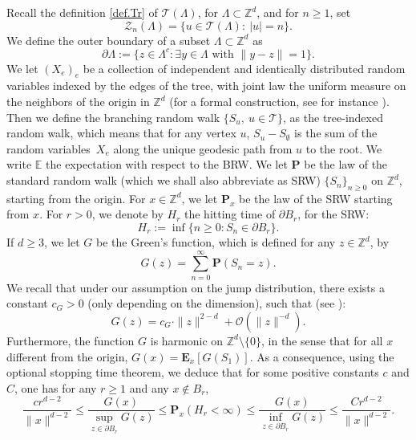 \documentclass[11pt]{article}
\numberwithin{equation}{section}
\theoremstyle{plain}
\theoremstyle{definition}
\newcommand\Z{\mathbb{Z}}
\newcommand\bE{\mathbb{E}}
\newcommand{\1}{{\text{\Large $\mathfrak 1$}}}
\begin{document}
Recall the definition \eqref{def.Tr} of $\mathcal T(\Lambda)$, for $\Lambda\subset
\Z^d$, and for $n\ge 1$, set
\begin{equation}\label{ZnLambda}
\mathcal Z_n(\Lambda)=\{u\in \mathcal T(\Lambda):\ |u|=n\}.
\end{equation}
We define the outer boundary of a subset $\Lambda\subset \mathbb Z^d$ as
\[
\partial \Lambda := \{ z \in \Lambda^c : \exists y\in \Lambda \text{ with }\|y-z\|= 1\}.
\]
We let $(X_e)_e$ be a collection of independent and identically distributed random variables indexed by the edges of the tree, with
joint law the uniform measure on the neighbors of the origin in $\mathbb Z^d$
(for a formal construction, see for instance \cite{Shi}). Then we define the branching random walk $\{S_u,\ u\in \mathbf {\mathcal T}\}$, as the tree-indexed random walk, which means that for
any vertex $u$, $S_u-S_\emptyset$ is the sum of the
random variables~$X_e$ along the unique geodesic path from $u$ to the root.
We write $\bE$ the expectation with respect to the BRW. We let
$\mathbf P$ be the law of the standard random walk (which we shall also abbreviate as SRW) $\{S_n\}_{n\ge 0}$ on $\Z^d$, starting from the origin.
For $x\in \mathbb Z^d$, we let $\mathbf P_x$ be the law of the SRW starting from $x$. For $r > 0$,
we denote by $H_r$ the hitting time
of $\partial B_r$, for the SRW:
\begin{equation}\label{Hr}
H_r:= \inf\{n \ge 0 : S_n \in \partial B_r\}.
\end{equation}
If $d\ge 3$, we let
$G$ be the Green's function, which is defined for any $z\in \mathbb Z^d$, by
\[
G(z) = \sum_{n=0}^\infty \mathbf P(S_n= z).
\]
We recall that under our assumption on the jump distribution, there exists a constant $c_G>0$ (only depending on the dimension), such that (see \cite[Th.\,4.3.1]{LL10}):
\begin{equation}\label{Green}
G(z) = c_G\cdot \|z\|^{2-d} + \mathcal O(\|z\|^{-d}).
\end{equation}
Furthermore, the function $G$ is harmonic on $\mathbb Z^d\setminus \{0\}$, in the sense that for all $x$ different from the origin,
$G(x) = \mathbf E_x[G(S_1)]$. As a consequence, using the optional stopping time theorem, we deduce that for some positive constants
$c$ and $C$, one has for any $r\ge 1$ and any $x\notin B_r$,
\begin{equation}\label{Green2}
\frac{cr^{d-2}}{\|x\|^{d-2}}\le \frac{G(x)}{\sup_{z\in \partial B_r} G(z)}
\le \mathbf P_x(H_r<\infty) \le \frac{G(x)}{\inf_{z\in \partial B_r} G(z)}
\le \frac{Cr^{d-2}}{\|x\|^{d-2}}.
\end{equation}
\end{document}
